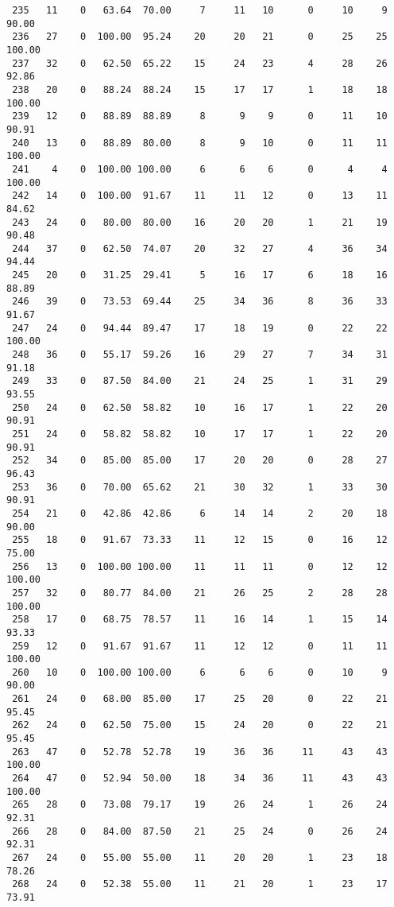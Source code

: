 \begin{verbatim}
 235   11    0   63.64  70.00     7     11   10      0     10     9    90.00
 236   27    0  100.00  95.24    20     20   21      0     25    25   100.00
 237   32    0   62.50  65.22    15     24   23      4     28    26    92.86
 238   20    0   88.24  88.24    15     17   17      1     18    18   100.00
 239   12    0   88.89  88.89     8      9    9      0     11    10    90.91
 240   13    0   88.89  80.00     8      9   10      0     11    11   100.00
 241    4    0  100.00 100.00     6      6    6      0      4     4   100.00
 242   14    0  100.00  91.67    11     11   12      0     13    11    84.62
 243   24    0   80.00  80.00    16     20   20      1     21    19    90.48
 244   37    0   62.50  74.07    20     32   27      4     36    34    94.44
 245   20    0   31.25  29.41     5     16   17      6     18    16    88.89
 246   39    0   73.53  69.44    25     34   36      8     36    33    91.67
 247   24    0   94.44  89.47    17     18   19      0     22    22   100.00
 248   36    0   55.17  59.26    16     29   27      7     34    31    91.18
 249   33    0   87.50  84.00    21     24   25      1     31    29    93.55
 250   24    0   62.50  58.82    10     16   17      1     22    20    90.91
 251   24    0   58.82  58.82    10     17   17      1     22    20    90.91
 252   34    0   85.00  85.00    17     20   20      0     28    27    96.43
 253   36    0   70.00  65.62    21     30   32      1     33    30    90.91
 254   21    0   42.86  42.86     6     14   14      2     20    18    90.00
 255   18    0   91.67  73.33    11     12   15      0     16    12    75.00
 256   13    0  100.00 100.00    11     11   11      0     12    12   100.00
 257   32    0   80.77  84.00    21     26   25      2     28    28   100.00
 258   17    0   68.75  78.57    11     16   14      1     15    14    93.33
 259   12    0   91.67  91.67    11     12   12      0     11    11   100.00
 260   10    0  100.00 100.00     6      6    6      0     10     9    90.00
 261   24    0   68.00  85.00    17     25   20      0     22    21    95.45
 262   24    0   62.50  75.00    15     24   20      0     22    21    95.45
 263   47    0   52.78  52.78    19     36   36     11     43    43   100.00
 264   47    0   52.94  50.00    18     34   36     11     43    43   100.00
 265   28    0   73.08  79.17    19     26   24      1     26    24    92.31
 266   28    0   84.00  87.50    21     25   24      0     26    24    92.31
 267   24    0   55.00  55.00    11     20   20      1     23    18    78.26
 268   24    0   52.38  55.00    11     21   20      1     23    17    73.91

\end{verbatim}

